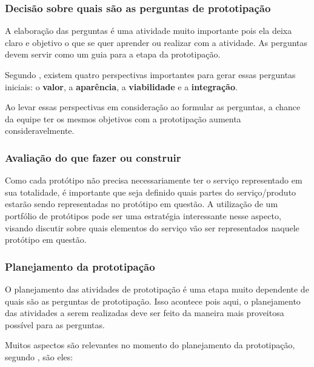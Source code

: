 \subsubsection{Decisão sobre quais são as perguntas de prototipação}

A elaboração das perguntas é uma atividade muito importante pois ela deixa claro e objetivo o que se quer aprender ou realizar com a atividade. As perguntas devem servir como um guia para a etapa da prototipação.

Segundo \cite{Stickdorn2019}, existem quatro perspectivas importantes para gerar essas perguntas iniciais: o \textbf{valor}, a \textbf{aparência}, a \textbf{viabilidade} e a \textbf{integração}. 

Ao levar essas perspectivas em consideração ao formular as perguntas, a chance da equipe ter os mesmos objetivos com a prototipação aumenta consideravelmente.

\subsubsection{Avaliação do que fazer ou construir}

Como cada protótipo não precisa necessariamente ter o serviço representado em sua totalidade, é importante que seja definido quais partes do serviço/produto estarão sendo representadas no protótipo em questão. A utilização de um portfólio de protótipos pode ser uma estratégia interessante nesse aspecto, visando discutir sobre quais elementos do serviço vão ser representados naquele protótipo em questão.

\subsubsection{Planejamento da prototipação}

O planejamento das atividades de prototipação é uma etapa muito dependente de quais são as perguntas de prototipação. Isso acontece pois aqui, o planejamento das atividades a serem realizadas deve ser feito da maneira mais proveitosa possível para as perguntas.

Muitos aspectos são relevantes no momento do planejamento da prototipação, segundo \cite{Stickdorn2019}, são eles:

